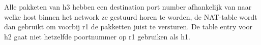 Alle pakketen van h3 hebben een destination port number afhankelijk van naar welke host binnen het network ze gestuurd horen te worden, de NAT-table wordt dan gebruikt om voorbij r1 de pakketten juist te versturen. De table entry voor h2 gaat niet hetzelfde poortnummer op r1 gebruiken als h1. 